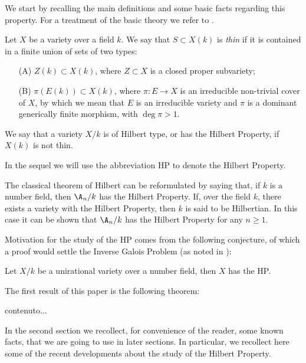 

We start by recalling the main definitions and some basic facts regarding this property. For a treatment of the basic theory we refer to \cite{Serre}.

\begin{definition}
	Let $X$ be a variety over a field $k$. We say that $S \subset X(k)$ is \emph{thin} if it is contained in a finite union of sets of two types:
	\begin{itemize}
		\item[(A)] $Z(k)\subset X(k)$, where $Z \subset X$ is a closed proper subvariety;
		\item[(B)] $\pi(E(k)) \subset X(k)$, where $\pi:E \longrightarrow X$ is an irreducible non-trivial cover of $X$, by which we mean that $E$ is an irreducible variety and $\pi$ is a dominant generically finite morphism, with $\deg \pi>1$.
	\end{itemize}
\end{definition}
\begin{definition}
	We say that a variety $X/k$ is of Hilbert type, or has the Hilbert Property, if $X(k)$ is not thin.
\end{definition}
In the sequel we will use the abbreviation HP to denote the Hilbert Property.

The classical theorem of Hilbert can be reformulated by saying that, if $k$ is a number field, then $\A_n/k$ has the Hilbert Property. If, over the field $k$, there exists a variety with the Hilbert Property, then $k$ is said to be Hilbertian. In this case it can be shown that $\A_n/k$ has the Hilbert Property for any $n \geq 1$.

Motivation for the study of the HP comes from the following conjecture, of which a proof would settle the Inverse Galois Problem (as noted in \cite{congetturastrong}):
\begin{conjecture}\label{congetturona}
	Let $X/k$ be a unirational variety over a number field, then $X$ has the HP.
\end{conjecture}

The first result of this paper is the following theorem:

\begin{theorem}
	contenuto...
\end{theorem}

In the second section we recollect, for convenience of the reader, some known facts, that we are going to use in later sections. In particular, we recollect here some of the recent developments about the study of the Hilbert Property.

